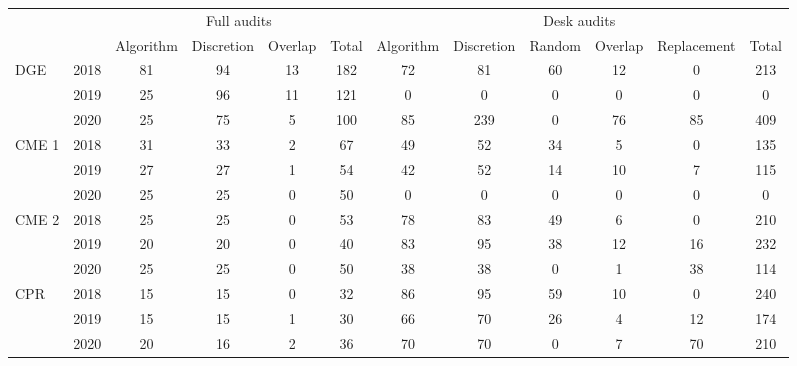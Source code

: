 \begin{tabular}{llcccc|cccccc} \hline & & \multicolumn{4}{c|}{Full audits} & \multicolumn{6}{c}{Desk audits} \\ \cline{3-6} \cline{7-12}
            & & Algorithm&  Discretion&     Overlap&       Total&   Algorithm&  Discretion&      Random&     Overlap& Replacement&       Total\\
\hline
\multirow{3}{*}{DGE} & 2018&          81&          94&          13&         182&          72&          81&          60&          12&           0&         213\\
& 2019      &          25&          96&          11&         121&           0&           0&           0&           0&           0&           0\\
& 2020      &          25&          75&           5&         100&          85&         239&           0&          76&          85&         409\\
\hline \multirow{3}{*}{CME 1} & 2018&          31&          33&           2&          67&          49&          52&          34&           5&           0&         135\\
& 2019      &          27&          27&           1&          54&          42&          52&          14&          10&           7&         115\\
& 2020      &          25&          25&           0&          50&           0&           0&           0&           0&           0&           0\\
\hline \multirow{3}{*}{CME 2} & 2018&          25&          25&           0&          53&          78&          83&          49&           6&           0&         210\\
& 2019      &          20&          20&           0&          40&          83&          95&          38&          12&          16&         232\\
& 2020      &          25&          25&           0&          50&          38&          38&           0&           1&          38&         114\\
\hline \multirow{3}{*}{CPR} & 2018&          15&          15&           0&          32&          86&          95&          59&          10&           0&         240\\
& 2019      &          15&          15&           1&          30&          66&          70&          26&           4&          12&         174\\
& 2020      &          20&          16&           2&          36&          70&          70&           0&           7&          70&         210\\

\end{tabular}

